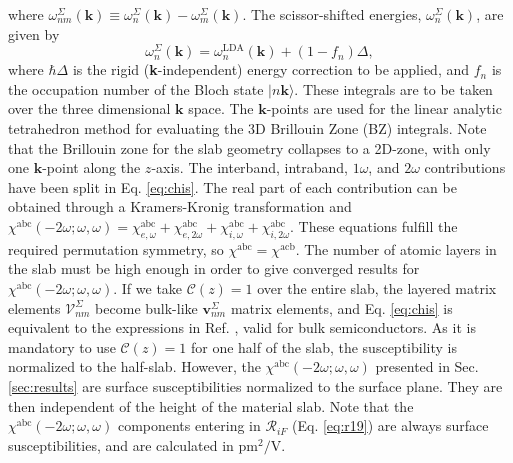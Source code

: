 \documentclass[prb,superscriptaddress,showpacs,twocolumn,letterpaper]{revtex4}
\begin{document}
where $\omega^\Sigma_{nm}(\mathbf{k})\equiv\omega^\Sigma_n(\mathbf{k})-\omega^
\Sigma_m(\mathbf{k})$. The scissor-shifted energies,
$\omega_{n}^\Sigma(\mathbf{k})$, are given by
\begin{equation*}
\omega_{n}^\Sigma(\mathbf{k})=
\omega^\mathrm{LDA}_{n}(\mathbf{k})+(1-f_{n})\Delta,
\end{equation*}
where $\hbar\Delta$ is the rigid (\textbf{k}-independent) energy correction to
be applied, and $f_n$ is the occupation number of the Bloch state
$|n\mathbf{k}\rangle$. These integrals are to be taken over the three
dimensional $\mathbf{k}$ space. The $\mathbf{k}$-points are used for the linear
analytic tetrahedron method for evaluating the 3D Brillouin Zone (BZ)
integrals.\cite{nastosPRB05} Note that the Brillouin zone for the slab geometry
collapses to a 2D-zone, with only one $\mathbf{k}$-point along the $z$-axis. The
interband, intraband, $1\omega$, and $2\omega$ contributions have been split in
Eq. \eqref{eq:chis}. The real part of each contribution can be obtained through
a Kramers-Kronig transformation\cite{nicolasPRB14} and
$\chi^{\text{a}\text{b}\text{c}}(-2\omega;\omega,\omega)=
 \chi^{\text{a}\text{b}\text{c}}_{e,\omega}
+\chi^{\text{a}\text{b}\text{c}}_{e,2\omega}
+\chi^{\text{a}\text{b}\text{c}}_{i,\omega}
+\chi^{\text{a}\text{b}\text{c}}_{i,2\omega}$. These equations fulfill the
required permutation symmetry, so $\chi^{\text{a}\text{b}\text{c}} =
\chi^{\text{a}\text{c}\text{b}}$. The number of atomic layers in the slab must
be high enough in order to give converged results for
$\chi^{\mathrm{abc}}(-2\omega;\omega,\omega)$. If we take $\mathcal{C}(z)=1$
over the entire slab, the layered matrix elements
$\boldsymbol{\mathcal{V}}^{\Sigma}_{nm}$ become bulk-like
$\mathbf{v}^{\Sigma}_{nm}$ matrix elements, and Eq. \eqref{eq:chis} is
equivalent to the expressions in Ref. , valid for bulk
semiconductors. As it is mandatory to use $\mathcal{C}(z)=1$ for one half of the
slab, the susceptibility is normalized to the half-slab. However, the
$\chi^{\mathrm{abc}}(-2\omega;\omega,\omega)$ presented in Sec.
\ref{sec:results} are surface susceptibilities normalized to the surface plane.
They are then independent of the height of the material slab. Note that the
$\chi^{\mathrm{abc}}(-2\omega;\omega,\omega)$ components entering in
$\mathcal{R}_{iF}$ (Eq. \ref{eq:r19}) are always surface susceptibilities,
and are calculated in $\text{pm}^{2}/\text{V}$.
\end{document}
